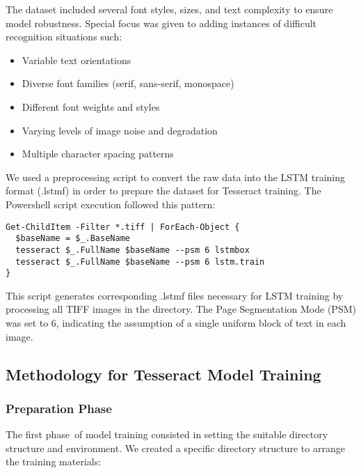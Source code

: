 The dataset included several font styles, sizes, and text complexity to ensure model robustness. Special focus was given to adding instances of difficult recognition situations such:


\begin{itemize}
    \item Variable text orientations
    \item Diverse font families (serif, sans-serif, monospace)
    \item Different font weights and styles
    \item Varying levels of image noise and degradation
    \item Multiple character spacing patterns
\end{itemize}

We used a preprocessing script to convert the raw data into the LSTM training format (.lstmf) in order to prepare the dataset for Tesseract training. The Powershell script execution followed this pattern:

\begin{verbatim}
Get-ChildItem -Filter *.tiff | ForEach-Object {
  $baseName = $_.BaseName
  tesseract $_.FullName $baseName --psm 6 lstmbox
  tesseract $_.FullName $baseName --psm 6 lstm.train
}

\end{verbatim}

This script generates corresponding .lstmf files necessary for LSTM training by processing all TIFF images in the directory. The Page Segmentation Mode (PSM) was set to 6, indicating the assumption of a single uniform block of text in each image.

\subsection{ Methodology for Tesseract Model Training}

\subsubsection{Preparation Phase
}
The first phase of model training consisted in setting the suitable directory structure and environment. We created a specific directory structure to arrange the training materials:

\vspace{0.8cm}


